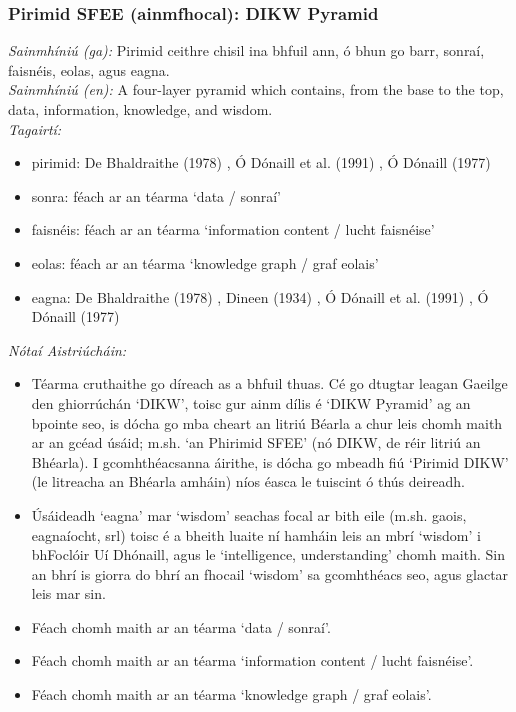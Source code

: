 \subsubsection*{Pirimid SFEE (ainmfhocal): DIKW Pyramid}
 \noindent \textit{Sainmhíniú (ga):} Pirimid ceithre chisil ina bhfuil ann, ó bhun go barr, sonraí, faisnéis, eolas, agus eagna.
\\
 \noindent \textit{Sainmhíniú (en):} A four-layer pyramid which contains, from the base to the top, data, information, knowledge, and wisdom.
\\
 \noindent \textit{Tagairtí:}
\begin{itemize}
	\item pirimid: De Bhaldraithe (1978) \cite{de-bhaldraithe}, Ó Dónaill et al. (1991) \cite{focloir-beag}, Ó Dónaill (1977) \cite{odonaill}
	\item sonra: féach ar an téarma `data / sonraí'
	\item faisnéis: féach ar an téarma `information content / lucht faisnéise'
	\item eolas: féach ar an téarma `knowledge graph / graf eolais'
	\item eagna: De Bhaldraithe (1978) \cite{de-bhaldraithe}, Dineen (1934) \cite{dineen}, Ó Dónaill et al. (1991) \cite{focloir-beag}, Ó Dónaill (1977) \cite{odonaill}
\end{itemize}

 \noindent \textit{Nótaí Aistriúcháin:}
\begin{itemize}
	\item Téarma cruthaithe go díreach as a bhfuil thuas. Cé go dtugtar leagan Gaeilge den ghiorrúchán `DIKW', toisc gur ainm dílis é `DIKW Pyramid' ag an bpointe seo, is dócha go mba cheart an litriú Béarla a chur leis chomh maith ar an gcéad úsáid; m.sh. `an Phirimid SFEE' (nó DIKW, de réir litriú an Bhéarla). I gcomhthéacsanna áirithe, is dócha go mbeadh fiú `Pirimid DIKW' (le litreacha an Bhéarla amháin) níos éasca le tuiscint ó thús deireadh.
	\item Úsáideadh `eagna' mar `wisdom' seachas focal ar bith eile (m.sh. gaois, eagnaíocht, srl) toisc é a bheith luaite ní hamháin leis an mbrí `wisdom' i bhFoclóir Uí Dhónaill, agus le `intelligence, understanding' chomh maith. Sin an bhrí is giorra do bhrí an fhocail `wisdom' sa gcomhthéacs seo, agus glactar leis mar sin.
	\item Féach chomh maith ar an téarma `data / sonraí'.
	\item Féach chomh maith ar an téarma `information content / lucht faisnéise'.
	\item Féach chomh maith ar an téarma `knowledge graph / graf eolais'.
\end{itemize}


